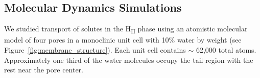 \documentclass[journal=jctcce,manuscript=article]{achemso}
\begin{document}
  \subsection{Molecular Dynamics Simulations}

  We studied transport of solutes in the H\textsubscript{II} phase using an
  atomistic molecular model of four pores in a monoclinic unit cell with 10\%
  water by weight (see Figure~\ref{fig:membrane_structure}). 
  Each unit cell contains $\sim$ 62,000 total atoms. 
  Approximately one third of the water molecules occupy the tail region with
  the rest near the pore center.
  
\end{document}
